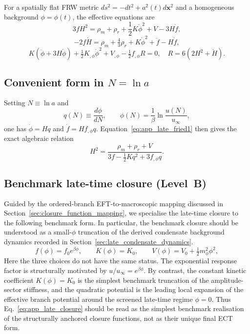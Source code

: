 \documentclass[11pt,a4paper]{article}
\numberwithin{equation}{section}
\begin{document}
For a spatially flat FRW metric $ds^2=-dt^2+a^2(t)d\mathbf{x}^2$ and a
homogeneous background $\phi=\phi(t)$, the effective equations are
\begin{equation}
3fH^2
=
\rho_m+\rho_r+\frac12 K\dot\phi^2+V-3H\dot f,
\label{eq:app_late_fried1}
\end{equation}
\begin{equation}
-2f\dot H
=
\rho_m+\tfrac43\rho_r+K\dot\phi^2+\ddot f-H\dot f,
\label{eq:app_late_fried2}
\end{equation}
\begin{equation}
K(\ddot\phi+3H\dot\phi)
+\tfrac12 K_{,\phi}\dot\phi^2
+V_{,\phi}
-\tfrac12 f_{,\phi}R
=0,
\quad
R=6(2H^2+\dot H).
\label{eq:app_late_phi_eq}
\end{equation}

\subsection{Convenient form in $N=\ln a$}

Setting $N\equiv \ln a$ and
\[
q(N)\equiv \frac{d\phi}{dN},
\qquad
\phi(N)=\frac{1}{\beta}\ln\!\frac{u(N)}{u_\infty},
\]
one has $\dot\phi=Hq$ and $\dot f=Hf_{,\phi}q$. Equation~\eqref{eq:app_late_fried1}
then gives the exact algebraic relation
\begin{equation}
H^2
=
\frac{\rho_m+\rho_r+V}
{3f-\frac12Kq^2+3f_{,\phi}q}.
\label{eq:app_late_H2_exact}
\end{equation}

\subsection{Benchmark late-time closure (Level~B)}

Guided by the ordered-branch EFT-to-macroscopic mapping discussed in
Section~\ref{sec:closure_function_mapping}, we specialise the late-time
closure to the following benchmark form.
In particular, the benchmark closure should be understood as a small-$\phi$
truncation of the derived condensate background dynamics recorded in
Section~\ref{sec:late_condensate_dynamics}.
\begin{equation}
f(\phi)=f_0 e^{\beta \phi},
\qquad
K(\phi)=K_0,
\qquad
V(\phi)=V_0+\tfrac12 m_\phi^2 \phi^2,
\label{eq:app_late_closure}
\end{equation}
Here the three choices do not have the same status.
The exponential response factor is structurally motivated by
$u/u_\infty=e^{\beta\phi}$.
By contrast, the constant kinetic coefficient $K(\phi)=K_0$ is the
simplest benchmark truncation of the amplitude-sector stiffness, and
the quadratic potential is the leading local expansion of the effective
branch potential around the screened late-time regime $\phi=0$.
Thus Eq.~\eqref{eq:app_late_closure} should be read as the simplest
benchmark realisation of the structurally anchored closure functions,
not as their unique final ECT form.
\end{document}
